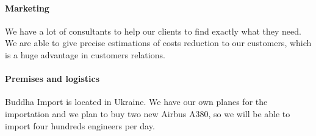 \documentclass[a4paper,12pt]{article}
\begin{document}
\paragraph{Marketing}
We have a lot of consultants to help our clients to find exactly what they
need. We are able to give precise estimations of costs reduction to our
customers, which is a huge advantage in customers relations.

\paragraph{Premises and logistics}
Buddha Import is located in Ukraine. We have our own planes for the importation
and we plan to buy two new Airbus A380, so we will be able to import four
hundreds engineers per day.
\end{document}
